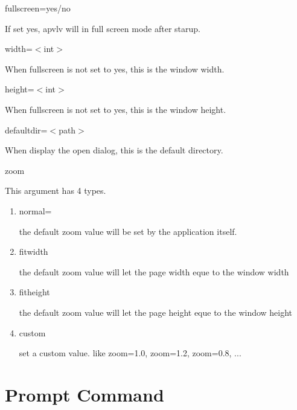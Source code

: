 \documentclass[a4paper,12pt]{article}
\begin{document}
\begin{description}

\item fullscreen=yes/no

If set yes, apvlv will in full screen mode after starup.

\item width=$<$int$>$

When fullscreen is not set to yes, this is the window width.

\item height=$<$int$>$

When fullscreen is not set to yes, this is the window height.

\item defaultdir=$<$path$>$

When display the open dialog, this is the default directory.

\item zoom

This argument has 4 types.

\begin{enumerate}

\item normal=

the default zoom value will be set by the application itself.

\item fitwidth

the default zoom value will let the page width eque to the window width

\item fitheight

the default zoom value will let the page height eque to the window height

\item custom

set a custom value. like zoom=1.0, zoom=1.2, zoom=0.8, ...

\end{enumerate}

\end{description}

\newpage

\section{Prompt Command}
\end{document}
